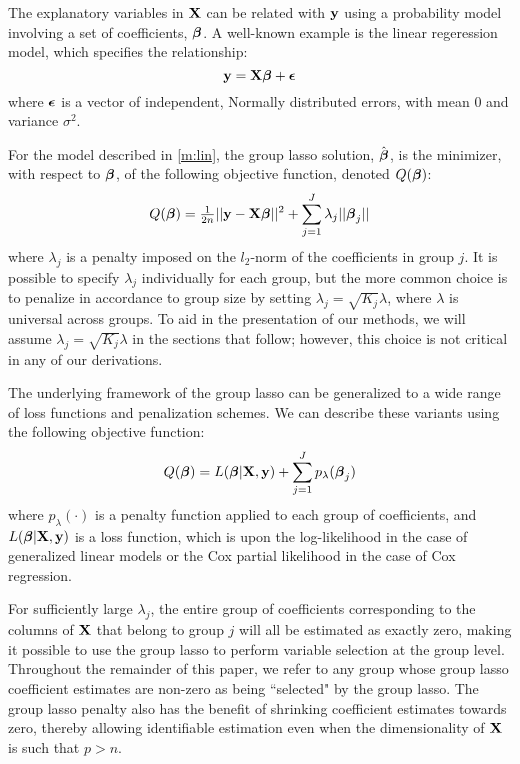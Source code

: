 The explanatory variables in $\mathbf{X}$ can be related with $\mathbf{y}$ using a probability model involving a set of coefficients, $\boldsymbol{\beta}$.  A well-known example is the linear regeression model, which specifies the relationship:
\begin{equation}
\label{m:lin}
\mathbf{y} = \mathbf{X}\boldsymbol{\beta} + \boldsymbol{\epsilon}
\end{equation}
where $\boldsymbol{\epsilon}$ is a vector of independent, Normally distributed errors, with mean 0 and variance $\sigma^2$. 

For the model described in \ref{m:lin}, the group lasso solution, $\hat{\boldsymbol{\beta}}$, is the minimizer, with respect to $\boldsymbol{\beta}$, of the following objective function, denoted $Q(\boldsymbol{\beta})$:
\begin{equation}
Q(\boldsymbol{\beta}) = \tfrac{1}{2n}||\mathbf{y} - \mathbf{X}\boldsymbol{\beta}||^2 + \sum_{j = 1}^{J}\lambda_j ||\boldsymbol{\beta}_j||
\end{equation}
where $\lambda_j$ is a penalty imposed on the $l_2$-norm of the coefficients in group $j$.  It is possible to specify $\lambda_j$ individually for each group, but the more common choice is to penalize in accordance to group size by setting $\lambda_j = \sqrt{K_j}\lambda$, where $\lambda$ is universal across groups. To aid in the presentation of our methods, we will assume $\lambda_j = \sqrt{K_j}\lambda$ in the sections that follow; however, this choice is not critical in any of our derivations.

The underlying framework of the group lasso can be generalized to a wide range of loss functions and penalization schemes. We can describe these variants using the following objective function:
\begin{equation}
Q(\boldsymbol{\beta}) = L(\boldsymbol{\beta}|\mathbf{X},\mathbf{y}) + \sum_{j = 1}^{J} p_{\lambda}(\boldsymbol{\beta}_j)
\end{equation}
where $p_{\lambda}(\cdot)$ is a penalty function applied to each group of coefficients, and $L(\boldsymbol{\beta}|\mathbf{X},\mathbf{y})$ is a loss function, which is upon the log-likelihood in the case of generalized linear models or the Cox partial likelihood in the case of Cox regression.

For sufficiently large $\lambda_j$, the entire group of coefficients corresponding to the columns of $\mathbf{X}$ that belong to group $j$ will all be estimated as exactly zero, making it possible to use the group lasso to perform variable selection at the group level.  Throughout the remainder of this paper, we refer to any group whose group lasso coefficient estimates are non-zero as being ``selected" by the group lasso.  The group lasso penalty also has the benefit of shrinking coefficient estimates towards zero, thereby allowing identifiable estimation even when the dimensionality of $\mathbf{X}$ is such that $p > n$.

